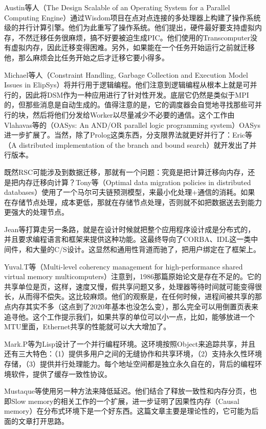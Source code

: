 \documentclass[a4paper,twoside]{scrbook}
\begin{document}
Austin等人（The Design Scalable of an Operating System for a Parallel Computing Engine）通过Wisdom项目在点对点连接的多处理器上构建了操作系统级的并行计算引擎。他们为此重写了操作系统。他们提出，硬件最好要支持虚拟内存，不然迁移任务很麻烦，搞不好要被迫生成PIC。他们使用的Transcomputer没有虚拟内存，因此迁移变得困难。另外，如果能在一个任务开始运行之前就迁移他，那么麻烦会比任务开始之后才迁移它要小得多。

Michael等人（Constraint Handling, Garbage Collection and Execution Model Issues in ElipSys）将并行用于逻辑编程。他们注意到逻辑编程从根本上就是可并行的，因此将DSM作为一种应用进行了针对性开发。底层它仍然是类似于MPI的，但那些消息是自动生成的。值得注意的是，它的调度器会自觉地寻找那些可并行的块，然后将他们分发给Worker以尽量减少不必要的通信。这个工作由Vlahavas等的（OASys: An AND/OR parallel logic programming system）OASys进一步扩展了。当然，除了Prolog这类东西，分支限界法就更好并行了：Eric等（A distributed implementation of the branch and bound search）就开发出了并行版本。

既然RSC可能涉及到数据迁移，那就有一个问题：究竟是把计算迁移向内存，还是把内存迁移向计算？Tony等（Optimal data migration policies in distributed databases）使用了一个马尔可夫链预测模型，来最小化处理+通信的消耗。如果在存储节点处理，成本更低，那就在存储节点处理，否则就不如把数据送去到能力更强大的处理节点。

Jean等打算走另一条路，就是在设计时候就把整个应用程序设计成是分布式的，并且要求编程语言和框架来提供这种功能。这最终导向了CORBA、IDL这一类中间件，和大量的C/S设计。这显然和通用性背道而驰了，把用户绑定在了框架上。

Yuval.T等（Multi-level coherency management for high-performance shared virtual memory multicomputers）注意到，1986那篇原始论文是存在不足的。它的共享单位是页，这样，速度又慢，假共享问题又多，处理器等待时间就可能变得很长，从而得不偿失。这比较麻烦。他们的观察是，在任何时候，进程间被共享的那点内存其实不多（这点到了2020年基本也没怎么变），那么完全可以用倒置页表来追寻他。这个工作提示我们，如果共享的单位可以小一点，比如，能够放进一个MTU里面，Ethernet共享的性能就可以大大增加了。

Mark.P等为Lisp设计了一个并行编程环境。这环境按照Object来追踪共享，并且还有三大特色：（1）提供多用户之间的无缝协作和共享环境，（2）支持永久性环境存储，（3）提供并行处理能力。每个地址空间都是独立永久自在的，背后的编程环境软件，提供了缓存一致性协议。

Mustaque等使用另一种方法来降低延迟。他们结合了释放一致性和内存分页，也即Slow memory的相关工作的一个扩展，进一步证明了因果性内存（Causal memory）在分布式环境下是一个好东西。这篇文章主要是理论性的，它可能为后面的文章打开思路。
\end{document}
